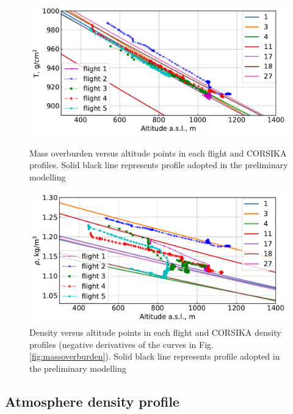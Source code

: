 \documentclass[final,5p,times,twocolumn]{elsarticle}
\begin{document}
\begin{figure}[bt]
\centering
\begin{minipage}[t]{0.48\textwidth}
    \includegraphics[width=\textwidth]{figs/atmosphere_T.pdf}
    \vspace{-1.0pc}
    \caption{Mass overburden versus altitude points in each flight and CORSIKA profiles. Solid black line represents profile adopted in the preliminary modelling}
\label{fig:massoverburden}
\end{minipage}
\vfill
\vspace{1pc}
\begin{minipage}[t]{0.48\textwidth}
    \includegraphics[width=\textwidth]{figs/atmosphere_rho.pdf}
    \vspace{-1.0pc}
    \caption{Density versus altitude points in each flight and CORSIKA density profiles (negative derivatives of the curves in Fig. \ref{fig:massoverburden}). Solid black line represents profile adopted in the preliminary modelling}
\label{fig:density}
\end{minipage}
\end{figure}

\subsection{Atmosphere density profile\label{sect:atmosphere-profile}}
\end{document}
